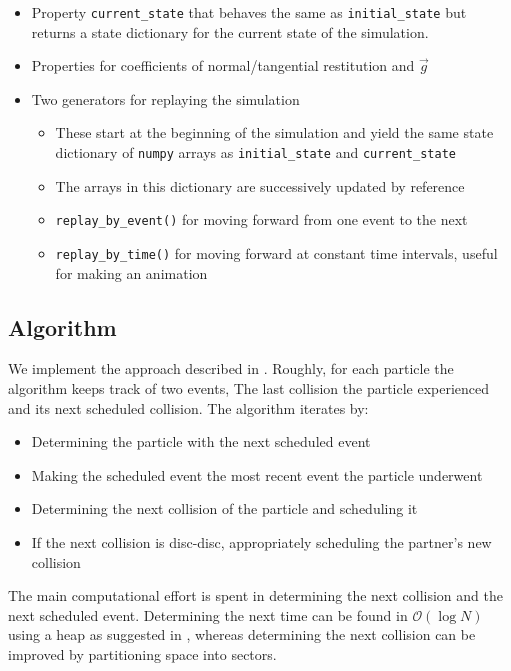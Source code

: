\documentclass{article}
\begin{document}
\begin{itemize}
\begin{itemize}
        \item Property \texttt{current\_state} that behaves the same as \texttt{initial\_state} but returns a state dictionary for the current state of the simulation.
        \item Properties for coefficients of normal/tangential restitution and $\vec{g}$
        \item Two generators for replaying the simulation
        \begin{itemize}
            \item These start at the beginning of the simulation and yield the same state dictionary of \texttt{numpy} arrays as \texttt{initial\_state} and \texttt{current\_state}
            \item The arrays in this dictionary are successively updated by reference
            \item \texttt{replay\_by\_event()} for moving forward from one event to the next
            \item \texttt{replay\_by\_time()} for moving forward at constant time intervals, useful for making an animation
        \end{itemize}
    \end{itemize}
\end{itemize}

\subsection{Algorithm}
We implement the approach described in \cite{Lubachevsky-1991}. Roughly, for each particle the algorithm keeps track of two events, The last collision the particle experienced and its next scheduled collision. The algorithm iterates by:
\begin{itemize}
    \item Determining the particle with the next scheduled event
    \item Making the scheduled event the most recent event the particle underwent 
    \item Determining the next collision of the particle and scheduling it
    \item If the next collision is disc-disc, appropriately scheduling the partner's new collision
\end{itemize}
The main computational effort is spent in determining the next collision and the next scheduled event. Determining the next time can be found in $\mathcal{O}(\log N)$ using a heap as suggested in \cite{Lubachevsky-1991}, whereas determining the next collision can be improved by partitioning space into sectors.
\end{document}
